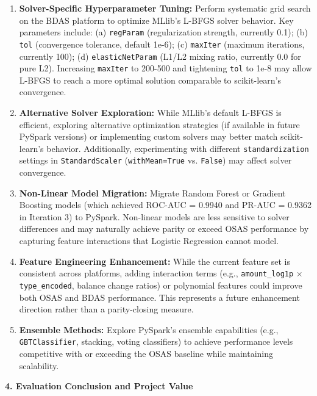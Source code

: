\documentclass[sigplan,screen]{acmart}
\begin{document}
\begin{enumerate}
\item \textbf{Solver-Specific Hyperparameter Tuning:} Perform systematic grid search on the BDAS platform to optimize MLlib's L-BFGS solver behavior. Key parameters include: (a) \texttt{regParam} (regularization strength, currently 0.1); (b) \texttt{tol} (convergence tolerance, default 1e-6); (c) \texttt{maxIter} (maximum iterations, currently 100); (d) \texttt{elasticNetParam} (L1/L2 mixing ratio, currently 0.0 for pure L2). Increasing \texttt{maxIter} to 200-500 and tightening \texttt{tol} to 1e-8 may allow L-BFGS to reach a more optimal solution comparable to scikit-learn's convergence.

\item \textbf{Alternative Solver Exploration:} While MLlib's default L-BFGS is efficient, exploring alternative optimization strategies (if available in future PySpark versions) or implementing custom solvers may better match scikit-learn's behavior. Additionally, experimenting with different \texttt{standardization} settings in \texttt{Standard\allowbreak Scaler} (\texttt{with\allowbreak Mean=\allowbreak True} vs. \texttt{False}) may affect solver convergence.

\item \textbf{Non-Linear Model Migration:} Migrate Random Forest or Gradient Boosting models (which achieved ROC-AUC = 0.9940 and PR-AUC = 0.9362 in Iteration 3) to PySpark. Non-linear models are less sensitive to solver differences and may naturally achieve parity or exceed OSAS performance by capturing feature interactions that Logistic Regression cannot model.

\item \textbf{Feature Engineering Enhancement:} While the current feature set is consistent across platforms, adding interaction terms (e.g., \texttt{amount\_log1p} × \texttt{type\_encoded}, balance change ratios) or polynomial features could improve both OSAS and BDAS performance. This represents a future enhancement direction rather than a parity-closing measure.

\item \textbf{Ensemble Methods:} Explore PySpark's ensemble capabilities (e.g., \texttt{GBTClassifier}, stacking, voting classifiers) to achieve performance levels competitive with or exceeding the OSAS baseline while maintaining scalability.
\end{enumerate}

\textbf{4. Evaluation Conclusion and Project Value}
\end{document}
